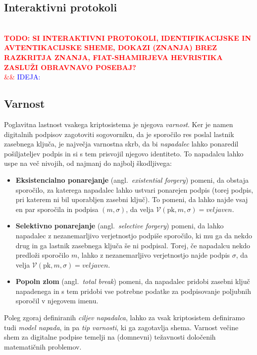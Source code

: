 \documentclass[isrm2, tisk]{fmfdelo}
\newcommand{\todo}[2][]{%
    \textcolor{red}{%
        \\ \textbf{\uppercase{todo: #2}}%
        \\%
        \ifx&#1&%
        \else%
            \textcolor{blue}{\uppercase{ideja:} #1}%
            \\%
        \fi%
    }%
}
\begin{document}
\subsection{Interaktivni protokoli}
\todo{si interaktivni protokoli, identifikacijske in avtentikacijske sheme, dokazi (znanja) brez 
razkritja znanja, fiat-shamirjeva hevristika zasluži obravnavo posebaj?}

\subsection{Varnost}
Poglavitna lastnost vsakega kriptosistema je njegova \textit{varnost}. Ker je namen digitalnih podpisov
zagotoviti sogovorniku, da je sporočilo res poslal lastnik zasebnega ključa, je največja varnostna
skrb, da bi \textit{napadalec} lahko ponaredil pošiljateljev podpis in si s tem prisvojil njegovo 
identiteto. To napadalcu lahko uspe na več nivojih, od najmanj do najbolj škodljivega:

\begin{itemize}
    \item \textbf{Eksistencialno ponarejanje} (angl.\ \textit{existential forgery}) pomeni, da obstaja
        sporočilo, za katerega napadalec lahko ustvari ponarejen podpis (torej podpis, pri katerem
        ni bil uporabljen zasebni ključ). To pomeni, da lahko najde vsaj en par sporočila in podpisa
        $(m, \sigma)$, da velja $\mathcal{V}(\text{pk}, m, \sigma) = veljaven$.
    \item \textbf{Selektivno ponarejanje} (angl.\ \textit{selective forgery}) pomeni, da lahko napadalec 
        z nezanemarljivo verjetnostjo podpiše sporočilo, ki mu ga da nekdo drug in ga lastnik zasebnega
        ključa še ni podpisal. Torej, če napadalcu nekdo predloži sporočilo $m$, lahko z nezanemarljivo 
        verjetnostjo najde podpis $\sigma$, da velja $\mathcal{V}(\text{pk}, m, \sigma) = veljaven$.
    \item \textbf{Popoln zlom} (angl.\ \textit{total break}) pomeni, da napadalec pridobi 
        zasebni ključ napadenega in s tem pridobi vse potrebne podatke za podpisovanje poljubnih
        sporočil v njegovem imenu.
\end{itemize}

Poleg zgoraj definiranih \textit{ciljev napadalca}, lahko za vsak kriptosistem definiramo tudi
\textit{model napada}, in pa \textit{tip varnosti}, ki ga zagotavlja shema. Varnost večine shem za 
digitalne podpise temelji na (domnevni) težavnosti določenih matematičnih problemov.
\end{document}
